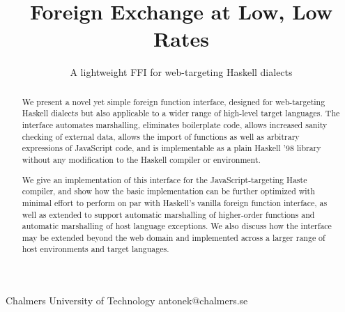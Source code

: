 \documentclass[preprint]{sigplanconf}
\begin{document}
\setlength{\pdfpageheight}{\paperheight}
\setlength{\pdfpagewidth}{\paperwidth}

\exclusivelicense
{} 





\title{Foreign Exchange at Low, Low Rates}
\subtitle{A lightweight FFI for web-targeting Haskell dialects}

           {Chalmers University of Technology}
           {antonek@chalmers.se}

\maketitle

\begin{abstract}
  We present a novel yet simple foreign function interface, designed for
  web-targeting Haskell dialects but also applicable to a wider range of
  high-level target languages.
  The interface automates marshalling, eliminates boilerplate
  code, allows increased sanity checking of external data,
  allows the import of functions as well as arbitrary expressions of
  JavaScript code, and is implementable as a plain Haskell '98 library
  without any modification to the Haskell compiler or environment.
  
  We give an implementation of this interface for the JavaScript-targeting
  Haste compiler, and show how the basic implementation can be
  further optimized with minimal effort to perform on par with Haskell's
  vanilla foreign function interface, as well as extended to support automatic
  marshalling of higher-order functions and automatic marshalling of host
  language exceptions.
  We also discuss how the interface may be extended beyond the web domain and
  implemented across a larger range of host environments and target languages.
\end{abstract}
\end{document}
